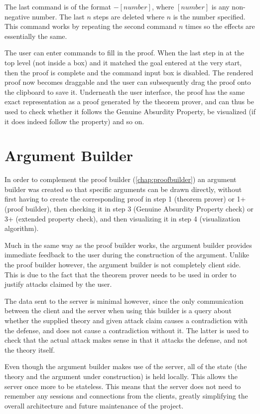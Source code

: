 \documentclass[11pt,twoside,a4paper]{report}
\begin{document}
The last command is of the format $-[number]$, where $[number]$ is any non-negative number. The last $n$ steps are deleted where $n$ is the number specified. This command works by repeating the second command $n$ times so the effects are essentially the same.

The user can enter commands to fill in the proof. When the last step in at the top level (not inside a box) and it matched the goal entered at the very start, then the proof is complete and the command input box is disabled. The rendered proof now becomes draggable and the user can subsequently drag the proof onto the clipboard to save it. Underneath the user interface, the proof has the same exact representation as a proof generated by the theorem prover, and can thus be used to check whether it follows the Genuine Absurdity Property, be visualized (if it does indeed follow the property) and so on.

\chapter{Argument Builder}
\label{chap:argbuilder}
In order to complement the proof builder (\autoref{chap:proofbuilder}) an argument builder was created so that specific arguments can be drawn directly, without first having to create the corresponding proof in step 1 (theorem prover) or 1+ (proof builder), then checking it in step 3 (Genuine Absurdity Property check) or 3+ (extended property check), and then visualizing it in step 4 (visualization algorithm). 

Much in the same way as the proof builder works, the argument builder provides immediate feedback to the user during the construction of the argument. Unlike the proof builder however, the argument builder is not completely client side. This is due to the fact that the theorem prover needs to be used in order to justify attacks claimed by the user.

The data sent to the server is minimal however, since the only communication between the client and the server when using this builder is a query about whether the supplied theory and given attack claim causes a contradiction with the defense, and does not cause a contradiction without it. The latter is used to check that the actual attack makes sense in that it attacks the defense, and not the theory itself.

Even though the argument builder makes use of the server, all of the state (the theory and the argument under construction) is held locally. This allows the server once more to be stateless. This means that the server does not need to remember any sessions and connections from the clients, greatly simplifying the overall architecture and future maintenance of the project.
\end{document}
